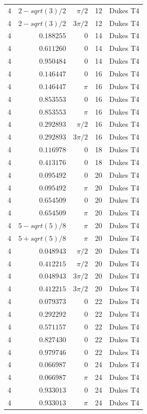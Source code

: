 \documentclass[aps,pra,reprint,amsmath,amssymb,superscriptaddress,floatfix]{revtex4-2}
\def\frac#1#2{#1/#2}%
\def\sqrt#1{sqrt(#1)}%
\begin{document}
\begin{longtable}{rrrrc}
4 & $\frac{2 - \sqrt{3}}{2}$ & $\pi/2$ & 12 & Dukes T4 \\
4 & $\frac{2 - \sqrt{3}}{2}$ & $3\pi/2$ & 12 & Dukes T4 \\
4 & $0.188255$ & $0$ & 14 & Dukes T4 \\
4 & $0.611260$ & $0$ & 14 & Dukes T4 \\
4 & $0.950484$ & $0$ & 14 & Dukes T4 \\
4 & $0.146447$ & $0$ & 16 & Dukes T4 \\
4 & $0.146447$ & $\pi$ & 16 & Dukes T4 \\
4 & $0.853553$ & $0$ & 16 & Dukes T4 \\
4 & $0.853553$ & $\pi$ & 16 & Dukes T4 \\
4 & $0.292893$ & $\pi/2$ & 16 & Dukes T4 \\
4 & $0.292893$ & $3\pi/2$ & 16 & Dukes T4 \\
4 & $0.116978$ & $0$ & 18 & Dukes T4 \\
4 & $0.413176$ & $0$ & 18 & Dukes T4 \\
4 & $0.095492$ & $0$ & 20 & Dukes T4 \\
4 & $0.095492$ & $\pi$ & 20 & Dukes T4 \\
4 & $0.654509$ & $0$ & 20 & Dukes T4 \\
4 & $0.654509$ & $\pi$ & 20 & Dukes T4 \\
4 & $\frac{5 - \sqrt{5}}{8}$ & $\pi$ & 20 & Dukes T4 \\
4 & $\frac{5 + \sqrt{5}}{8}$ & $\pi$ & 20 & Dukes T4 \\
4 & $0.048943$ & $\pi/2$ & 20 & Dukes T4 \\
4 & $0.412215$ & $\pi/2$ & 20 & Dukes T4 \\
4 & $0.048943$ & $3\pi/2$ & 20 & Dukes T4 \\
4 & $0.412215$ & $3\pi/2$ & 20 & Dukes T4 \\
4 & $0.079373$ & $0$ & 22 & Dukes T4 \\
4 & $0.292292$ & $0$ & 22 & Dukes T4 \\
4 & $0.571157$ & $0$ & 22 & Dukes T4 \\
4 & $0.827430$ & $0$ & 22 & Dukes T4 \\
4 & $0.979746$ & $0$ & 22 & Dukes T4 \\
4 & $0.066987$ & $0$ & 24 & Dukes T4 \\
4 & $0.066987$ & $\pi$ & 24 & Dukes T4 \\
4 & $0.933013$ & $0$ & 24 & Dukes T4 \\
4 & $0.933013$ & $\pi$ & 24 & Dukes T4 \\

\end{longtable}
\end{document}
